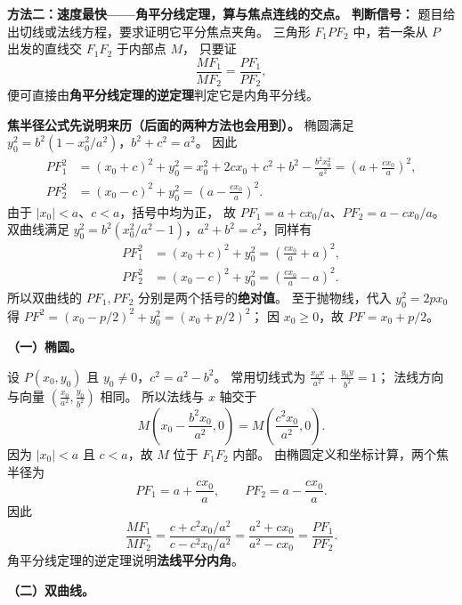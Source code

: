 \clearpage
\begin{proofbox}
\textbf{方法二：速度最快——角平分线定理，算与焦点连线的交点。}
\textbf{判断信号：} 题目给出切线或法线方程，要求证明它平分焦点夹角。
三角形 $F_1PF_2$ 中，若一条从 $P$ 出发的直线交 $F_1F_2$ 于内部点 $M$，
只要证
\[
\frac{MF_1}{MF_2}=\frac{PF_1}{PF_2},
\]
便可直接由\textbf{角平分线定理的逆定理}判定它是内角平分线。

\textbf{焦半径公式先说明来历（后面的两种方法也会用到）。}
椭圆满足 $y_0^2=b^2(1-x_0^2/a^2)$，$b^2+c^2=a^2$。
因此
\[
\begin{aligned}
PF_1^2&=(x_0+c)^2+y_0^2
=x_0^2+2cx_0+c^2+b^2-\frac{b^2x_0^2}{a^2}
=\left(a+\frac{cx_0}{a}\right)^2,\\
PF_2^2&=(x_0-c)^2+y_0^2
=\left(a-\frac{cx_0}{a}\right)^2.
\end{aligned}
\]
由于 $|x_0|<a$、$c<a$，括号中均为正，
故 $PF_1=a+cx_0/a$、$PF_2=a-cx_0/a$。
双曲线满足 $y_0^2=b^2(x_0^2/a^2-1)$，$a^2+b^2=c^2$，同样有
\[
\begin{aligned}
PF_1^2&=(x_0+c)^2+y_0^2
=\left(\frac{cx_0}{a}+a\right)^2,\\
PF_2^2&=(x_0-c)^2+y_0^2
=\left(\frac{cx_0}{a}-a\right)^2.
\end{aligned}
\]
所以双曲线的 $PF_1,PF_2$ 分别是两个括号的\textbf{绝对值}。
至于抛物线，代入 $y_0^2=2px_0$ 得
$PF^2=(x_0-p/2)^2+y_0^2=(x_0+p/2)^2$；
因 $x_0\ge0$，故 $PF=x_0+p/2$。

\par\medskip\begin{minipage}{\linewidth}
\textbf{（一）椭圆。}
\begin{center}\end{center}
\end{minipage}\par

设 $P(x_0,y_0)$ 且 $y_0\ne0$，$c^2=a^2-b^2$。
常用切线式为 $\tfrac{x_0x}{a^2}+\tfrac{y_0y}{b^2}=1$；
法线方向与向量 $(\tfrac{x_0}{a^2},\tfrac{y_0}{b^2})$ 相同。
所以法线与 $x$ 轴交于
\[
M\left(x_0-\frac{b^2x_0}{a^2},0\right)
=M\left(\frac{c^2x_0}{a^2},0\right).
\]
因为 $|x_0|<a$ 且 $c<a$，故 $M$ 位于 $F_1F_2$ 内部。
由椭圆定义和坐标计算，两个焦半径为
\[
PF_1=a+\frac{cx_0}{a},\qquad PF_2=a-\frac{cx_0}{a}.
\]
因此
\[
\frac{MF_1}{MF_2}
=\frac{c+c^2x_0/a^2}{c-c^2x_0/a^2}
=\frac{a^2+cx_0}{a^2-cx_0}
=\frac{PF_1}{PF_2}.
\]
角平分线定理的逆定理说明\textbf{法线平分内角}。

\par\medskip\begin{minipage}{\linewidth}
\textbf{（二）双曲线。}
\begin{center}\end{center}
\end{minipage}\par


\end{proofbox}
